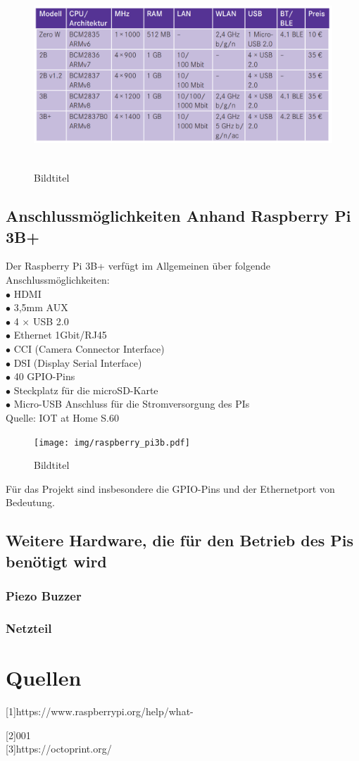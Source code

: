 \documentclass[12pt,a4paper,openany]{scrbook}
\begin{document}
	\begin{figure}[!h]
	\centering
	\includegraphics[height=200pt]{img/tabelle_pi_vergleich}
	\caption{Bildtitel}
	\label{Bildlabel}
\end{figure}


\section{Anschlussmöglichkeiten Anhand Raspberry Pi 3B+}
Der Raspberry Pi 3B+ verfügt im Allgemeinen über folgende Anschlussmöglichkeiten:\\[3mm] 
$\bullet$ HDMI   \\ %
$\bullet$ 3,5mm AUX\\ 
$\bullet$ 4 $\times$ USB 2.0 \\ 
$\bullet$ Ethernet 1Gbit/RJ45\\ 
$\bullet$ CCI (Camera Connector Interface)\\ 
$\bullet$  DSI (Display Serial Interface)\\
$\bullet$ 40 GPIO-Pins\\
$\bullet$ Steckplatz für die microSD-Karte\\
$\bullet$ Micro-USB Anschluss für die Stromversorgung des PIs\\
Quelle: IOT at Home S.60\\ [10mm]

	\begin{figure}[!h]
		\centering
		\texttt{[image: img/raspberry\_pi3b.pdf]}
		\caption{Bildtitel}
		\label{Bildlabel}
	\end{figure}
Für das Projekt sind insbesondere die GPIO-Pins und der Ethernetport von Bedeutung.\\ 
  

\section{Weitere Hardware, die für den Betrieb des Pis benötigt wird}
\subsection{Piezo Buzzer}

\subsection{Netzteil}
\vspace{1cm}
\centering

\chapter{Quellen}
[1]https://www.raspberrypi.org/help/what-%

[2]001\\ 

[3]https://octoprint.org/
\end{document}
